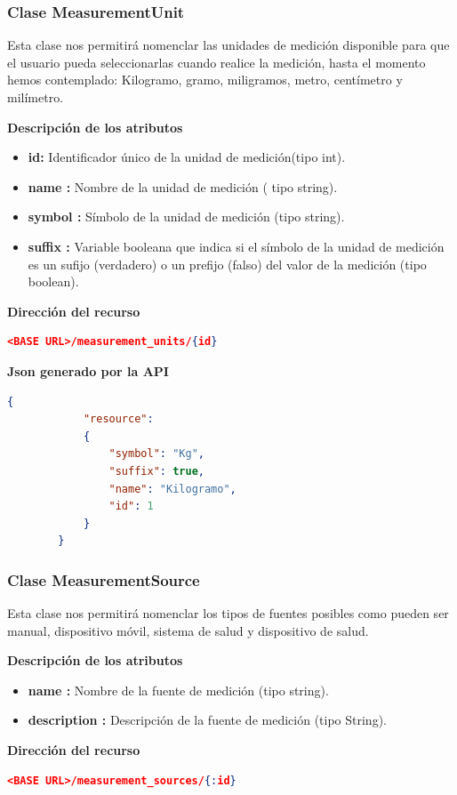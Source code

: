 \subsubsection{ Clase MeasurementUnit }
Esta clase nos permitirá  nomenclar  las unidades de medición disponible para que el usuario pueda seleccionarlas cuando realice la medición, hasta el momento hemos contemplado: Kilogramo, gramo, miligramos, metro, centímetro y milímetro.

    \textbf{Descripción de los atributos}
        \begin{itemize}
            \item \textbf{id:	}	Identificador único de la unidad de medición(tipo int).
            \item \textbf{name :	}	Nombre de la unidad de medición ( tipo string).
            \item \textbf{symbol :}		Símbolo de la unidad de medición (tipo string).
            \item \textbf{suffix :}	Variable booleana que indica si el símbolo de la unidad de medición es un sufijo (verdadero) o un prefijo (falso) del valor de la medición (tipo boolean).
        \end{itemize}

    \textbf{Dirección del recurso}
        \begin{lstlisting}[language=json,firstnumber=1]
        <BASE URL>/measurement_units/{id}
        \end{lstlisting}

    \textbf{Json generado por la API} 
        \begin{lstlisting}[language=json,firstnumber=1]
        {
            "resource": 
            {
                "symbol": "Kg",
                "suffix": true,
                "name": "Kilogramo",
                "id": 1
            }
        }
        \end{lstlisting}

\subsubsection{ Clase MeasurementSource}
Esta clase nos permitirá nomenclar los tipos de fuentes posibles como pueden ser manual, dispositivo móvil, sistema de salud y dispositivo de salud.
    
	\textbf{Descripción de los atributos}
        \begin{itemize}
            \item \textbf{name 	:}	Nombre de la fuente de medición (tipo string).
            \item \textbf{description 	:}	Descripción de la fuente de medición (tipo String).
        \end{itemize}
    \textbf{Dirección del recurso}
    \begin{lstlisting}[language=json,firstnumber=1]
    <BASE URL>/measurement_sources/{:id}
    \end{lstlisting}

